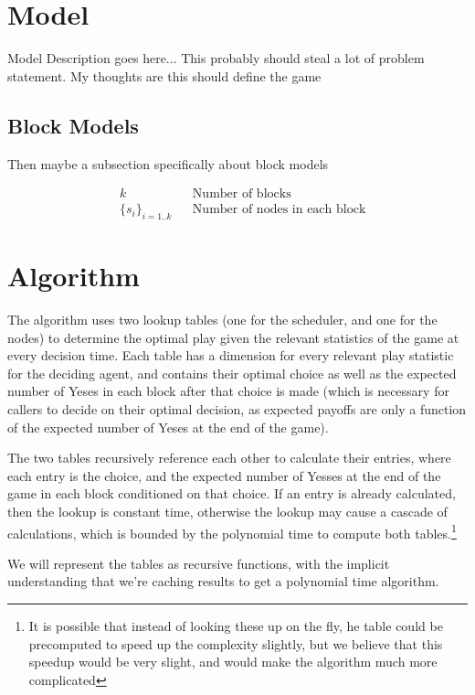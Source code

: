\documentclass{article}
\begin{document}
\section{Model}

Model Description goes here... This probably should steal a lot of
problem statement. My thoughts are this should define the game

\subsection{Block Models}

Then maybe a subsection specifically about block models

\begin{align*}
  & k && \text{Number of blocks} \\
  & \{s_i\}_{i=1..k} && \text{Number of nodes in each block}
\end{align*}

\section{Algorithm}
\label{sec:algorithm}

The algorithm uses two lookup tables (one for the scheduler, and one
for the nodes) to determine the optimal play given the relevant
statistics of the game at every decision time. Each table has a
dimension for every relevant play statistic for the deciding agent,
and contains their optimal choice as well as the expected number of
Yeses in each block after that choice is made (which is necessary for
callers to decide on their optimal decision, as expected payoffs are
only a function of the expected number of Yeses at the end of the
game).

The two tables recursively reference each other to calculate their
entries, where each entry is the choice, and the expected number of
Yesses at the end of the game in each block conditioned on that
choice. If an entry is already calculated, then the lookup is constant
time, otherwise the lookup may cause a cascade of calculations, which
is bounded by the polynomial time to compute both tables.\footnote{It
  is possible that instead of looking these up on the fly, he table
  could be precomputed to speed up the complexity slightly, but we
  believe that this speedup would be very slight, and would make the
  algorithm much more complicated}

We will represent the tables as recursive functions, with the implicit
understanding that we're caching results to get a polynomial time
algorithm.
\end{document}

